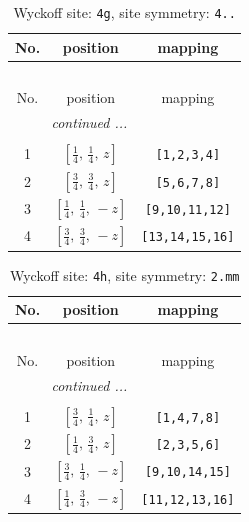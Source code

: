 \documentclass[fleqn,8pt]{jsarticle}
\begin{document}
\renewcommand{\arraystretch}{1.2}
\begin{longtable}{ccc}
\caption{Wyckoff site: {\tt 4g}, site symmetry: {\tt 4..}}
 \\
 \hline \hline
No. & position & mapping \\ \hline \endfirsthead

\multicolumn{2}{l}{\tablename\ \thetable{}} \\
 \hline \hline
No. & position & mapping \\ \hline \endhead

 \hline \hline
\multicolumn{2}{r}{\footnotesize\it continued ...} \\ \endfoot

 \hline \hline
\multicolumn{2}{r}{} \\ \endlastfoot

1 & $\left[ \frac{1}{4},\, \frac{1}{4},\, z \right]$ & {\tt [1,2,3,4]} \\ \hline
2 & $\left[ \frac{3}{4},\, \frac{3}{4},\, z \right]$ & {\tt [5,6,7,8]} \\ \hline
3 & $\left[ \frac{1}{4},\, \frac{1}{4},\, - z \right]$ & {\tt [9,10,11,12]} \\ \hline
4 & $\left[ \frac{3}{4},\, \frac{3}{4},\, - z \right]$ & {\tt [13,14,15,16]} \\
\end{longtable}
\renewcommand{\arraystretch}{1.2}
\begin{longtable}{ccc}
\caption{Wyckoff site: {\tt 4h}, site symmetry: {\tt 2.mm}}
 \\
 \hline \hline
No. & position & mapping \\ \hline \endfirsthead

\multicolumn{2}{l}{\tablename\ \thetable{}} \\
 \hline \hline
No. & position & mapping \\ \hline \endhead

 \hline \hline
\multicolumn{2}{r}{\footnotesize\it continued ...} \\ \endfoot

 \hline \hline
\multicolumn{2}{r}{} \\ \endlastfoot

1 & $\left[ \frac{3}{4},\, \frac{1}{4},\, z \right]$ & {\tt [1,4,7,8]} \\ \hline
2 & $\left[ \frac{1}{4},\, \frac{3}{4},\, z \right]$ & {\tt [2,3,5,6]} \\ \hline
3 & $\left[ \frac{3}{4},\, \frac{1}{4},\, - z \right]$ & {\tt [9,10,14,15]} \\ \hline
4 & $\left[ \frac{1}{4},\, \frac{3}{4},\, - z \right]$ & {\tt [11,12,13,16]} \\
\end{longtable}
\end{document}
